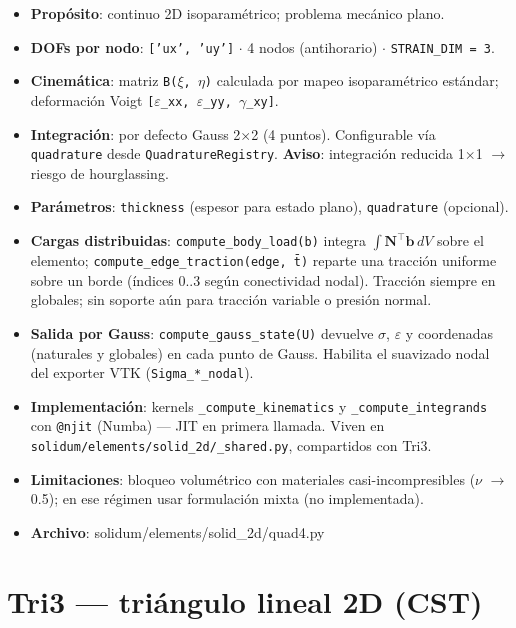 \documentclass[11pt,letterpaper,oneside]{report}
\begin{document}
\begin{itemize}
  \item \textbf{Propósito}: continuo 2D isoparamétrico; problema mecánico plano.
  \item \textbf{DOFs por nodo}: \texttt{['ux', 'uy']} \ensuremath{\cdot} 4 nodos (antihorario) \ensuremath{\cdot} \texttt{STRAIN\_DIM = 3}.
  \item \textbf{Cinemática}: matriz \texttt{B(\ensuremath{\xi}, \ensuremath{\eta})} calculada por mapeo isoparamétrico estándar; deformación Voigt \texttt{[\ensuremath{\varepsilon}\_xx, \ensuremath{\varepsilon}\_yy, \ensuremath{\gamma}\_xy]}.
  \item \textbf{Integración}: por defecto Gauss 2\ensuremath{\times}2 (4 puntos). Configurable vía \texttt{quadrature} desde \texttt{QuadratureRegistry}. \textbf{Aviso}: integración reducida 1\ensuremath{\times}1 \ensuremath{\to} riesgo de hourglassing.
  \item \textbf{Parámetros}: \texttt{thickness} (espesor para estado plano), \texttt{quadrature} (opcional).
  \item \textbf{Cargas distribuidas}: \texttt{compute\_body\_load(b)} integra $\int \mathbf N^\top \mathbf b\, dV$ sobre el elemento; \texttt{compute\_edge\_traction(edge, t̄)} reparte una tracción uniforme sobre un borde (índices 0..3 según conectividad nodal). Tracción siempre en globales; sin soporte aún para tracción variable o presión normal.
  \item \textbf{Salida por Gauss}: \texttt{compute\_gauss\_state(U)} devuelve \ensuremath{\sigma}, \ensuremath{\varepsilon} y coordenadas (naturales y globales) en cada punto de Gauss. Habilita el suavizado nodal del exporter VTK (\texttt{Sigma\_*\_nodal}).
  \item \textbf{Implementación}: kernels \texttt{\_compute\_kinematics} y \texttt{\_compute\_integrands} con \texttt{@njit} (Numba) --- JIT en primera llamada. Viven en \texttt{solidum/elements/solid\_2d/\_shared.py}, compartidos con Tri3.
  \item \textbf{Limitaciones}: bloqueo volumétrico con materiales casi-incompresibles (\ensuremath{\nu} \ensuremath{\to} 0.5); en ese régimen usar formulación mixta (no implementada).
  \item \textbf{Archivo}: solidum/elements/solid\_2d/quad4.py
\end{itemize}


\section{Tri3 --- triángulo lineal 2D (CST)}
\end{document}
